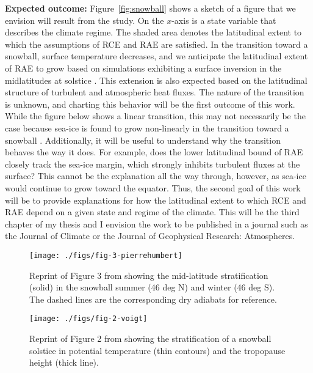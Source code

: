 \documentclass{article}
\begin{document}
\textbf{Expected outcome:} Figure~\ref{fig:snowball} shows a sketch of a figure that we envision will result from the study. On the $x$-axis is a state variable that describes the climate regime. The shaded area denotes the latitudinal extent to which the assumptions of RCE and RAE are satisfied. In the transition toward a snowball, surface temperature decreases, and we anticipate the latitudinal extent of RAE to grow based on simulations exhibiting a surface inversion in the midlatitudes at solstice \citep{pierrehumbert-2004}. This extension is also expected based on the latitudinal structure of turbulent and atmospheric heat fluxes. The nature of the transition is unknown, and charting this behavior will be the first outcome of this work. While the figure below shows a linear transition, this may not necessarily be the case because sea-ice is found to grow non-linearly in the transition toward a snowball \citep{voigt-marotzke-2010}. Additionally, it will be useful to understand why the transition behaves the way it does. For example, does the lower latitudinal bound of RAE closely track the sea-ice margin, which strongly inhibits turbulent fluxes at the surface? This cannot be the explanation all the way through, however, as sea-ice would continue to grow toward the equator. Thus, the second goal of this work will be to provide explanations for how the latitudinal extent to which RCE and RAE depend on a given state and regime of the climate. This will be the third chapter of my thesis and I envision the work to be published in a journal such as the Journal of Climate or the Journal of Geophysical Research: Atmospheres.

\begin{figure}
\centering
\texttt{[image: ./figs/fig-3-pierrehumbert]}
\caption{Reprint of Figure 3 from \citet{pierrehumbert-2004} showing the mid-latitude stratification (solid) in the snowball summer (46 deg N) and winter (46 deg S). The dashed lines are the corresponding dry adiabats for reference.}
\label{fig:fig-3-pierrehumbert}
\end{figure}

\begin{figure}
\centering
\texttt{[image: ./figs/fig-2-voigt]}
\caption{Reprint of Figure 2 from \citet{voigt-2013} showing the stratification of a snowball solstice in potential temperature (thin contours) and the tropopause height (thick line).}
\label{fig:fig-2-voigt}
\end{figure}
\end{document}
